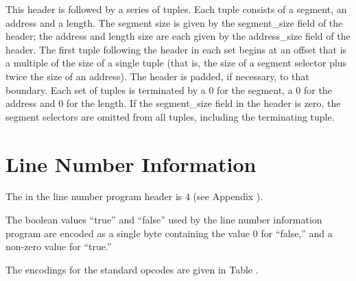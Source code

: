 This header is followed by a series of tuples. Each tuple
consists of a segment, an address and a length. 
The segment
size is given by the segment\_size field of the header; the
address and length size are each given by the address\_size
field of the header. 
The first tuple following the header in
each set begins at an offset that is a multiple of the size
of a single tuple (that is, the size of a segment selector
plus twice the size of an address). 
The header is padded, if
necessary, to that boundary. Each set of tuples is terminated
by a 0 for the segment, a 0 for the address and 0 for the
length. If the segment\_size field in the header is zero,
the segment selectors are omitted from all tuples, including
the terminating tuple.


\section{Line Number Information}
\label{datarep:linenumberinformation}

The 
in the line number program header is 4
(see Appendix ). 

The boolean values ``true'' and ``false'' 
used by the line number information program are encoded
as a single byte containing the value 0 
for ``false,'' and a non-zero value for ``true.''

The encodings for the standard opcodes are given in 
Table .

